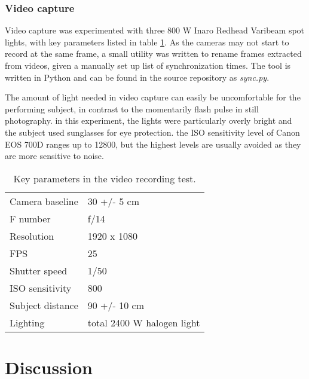 \subsubsection{Video capture}

Video capture was experimented with three 800 W Inaro Redhead Varibeam spot lights, with key parameters listed in table \ref{tab:samplevideoparams}.
As the cameras may not start to record at the same frame, a small utility was written to rename frames extracted from videos, given a manually set up list of synchronization times.
The tool is written in Python and can be found in the source repository as \emph{sync.py}.

The amount of light needed in video capture can easily be uncomfortable for the performing subject, in contrast to the momentarily flash pulse in still photography.
in this experiment, the lights were particularly overly bright and the subject used sunglasses for eye protection.
the ISO sensitivity level of Canon EOS 700D ranges up to 12800, but the highest levels are usually avoided as they are more sensitive to noise.

\begin{table}[h]
	\centering
	\begin{tabular}{l l}
		Camera baseline & 30 +/- 5 cm\\
		F number & f/14\\
		Resolution & 1920 x 1080\\
		FPS & 25\\
		Shutter speed & 1/50\\
		ISO sensitivity & 800\\
		Subject distance & 90 +/- 10 cm\\
		Lighting & total 2400 W halogen light\\
	\end{tabular}
	\caption{
		Key parameters in the video recording test. %
	}
	\label{tab:samplevideoparams}
\end{table}


\clearpage

\section{Discussion} \label{sec:discussion}

